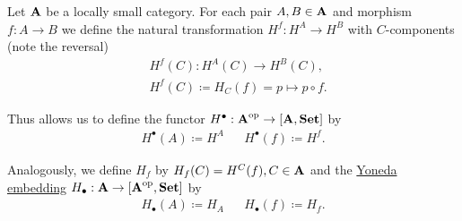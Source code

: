 \begin{definition}\label{def:yoneda_embedding}\cite[definitions 4.1.15, 4.1.21]{Leinster2014}
  Let $\operatorname{\mathbf{A}}$ be a locally small category. For each pair $A, B \in \operatorname{\mathbf{A}}$ and morphism $f: A \to B$ we define the natural transformation $H^f: H^A \to H^B$ with $C$-components (note the reversal)
  \begin{align*}
    &H^f(C): H^A(C) \to H^B(C), \\
    &H^f(C) \coloneqq H_C(f) = p \mapsto p \circ f.
  \end{align*}

  Thus allows us to define the functor $H^\bullet: \operatorname{\mathbf{A}}^{\operatorname{op}} \to [\operatorname{\mathbf{A}}, \operatorname{\mathbf{Set}}]$ by
  \begin{align*}
    H^\bullet(A) \coloneqq H^A && H^\bullet(f) \coloneqq H^f.
  \end{align*}

  Analogously, we define $H_f$ by $H_f(C) = H^C(f), C \in \operatorname{\mathbf{A}}$ and the \ul{Yoneda embedding} $H_\bullet: \operatorname{\mathbf{A}} \to [\operatorname{\mathbf{A}}^{\operatorname{op}}, \operatorname{\mathbf{Set}}]$ by
  \begin{align*}
    H_\bullet(A) \coloneqq H_A && H_\bullet(f) \coloneqq H_f.
  \end{align*}
\end{definition}


